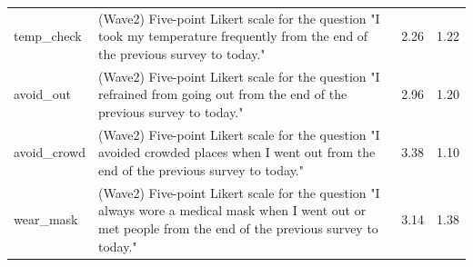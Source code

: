 \documentclass[
    a4paper
]{article}
\begin{document}
\begin{table}[!h]
\begin{tabular}[t]{l>{\raggedright\arraybackslash}p{30em}cc}
temp\_check & (Wave2) Five-point Likert scale for the question "I took my temperature frequently from the end of the previous survey to today." & \num{2.26} & \num{1.22}\\
avoid\_out & (Wave2) Five-point Likert scale for the question "I refrained from going out from the end of the previous survey to today." & \num{2.96} & \num{1.20}\\
avoid\_crowd & (Wave2) Five-point Likert scale for the question "I avoided crowded places when I went out from the end of the previous survey to today." & \num{3.38} & \num{1.10}\\
wear\_mask & (Wave2) Five-point Likert scale for the question "I always wore a medical mask when I went out or met people from the end of the previous survey to today." & \num{3.14} & \num{1.38}\\
\bottomrule
\end{tabular}
\end{table}
\end{document}
